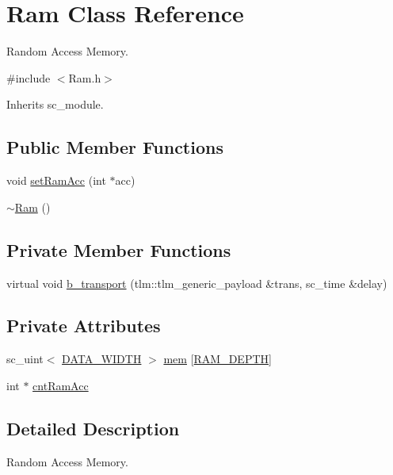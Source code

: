 \hypertarget{classRam}{\section{Ram Class Reference}
\label{classRam}
}


Random Access Memory.  




{\ttfamily \#include $<$Ram.\+h$>$}



Inherits sc\+\_\+module.

\subsection*{Public Member Functions}
\begin{DoxyCompactItemize}
\item 
void \hyperlink{classRam_ae60158266ebc375950bf310fcbebb95f}{set\+Ram\+Acc} (int $\ast$acc)
\item 
\hyperlink{classRam_a88fb1e8b99dad1628805952c41a146e3}{$\sim$\+Ram} ()
\end{DoxyCompactItemize}
\subsection*{Private Member Functions}
\begin{DoxyCompactItemize}
\item 
virtual void \hyperlink{classRam_a93cee12a3589cd5b05e16a88ed0ed5f1}{b\+\_\+transport} (tlm\+::tlm\+\_\+generic\+\_\+payload \&trans, sc\+\_\+time \&delay)
\end{DoxyCompactItemize}
\subsection*{Private Attributes}
\begin{DoxyCompactItemize}
\item 
sc\+\_\+uint$<$ \hyperlink{Defines_8h_af087b76f9707be9d3b43ba0c782c31c3}{D\+A\+T\+A\+\_\+\+W\+I\+D\+T\+H} $>$ \hyperlink{classRam_ade86bafdb14f3ddb236bcf807abab45c}{mem} \mbox{[}\hyperlink{Defines_8h_ab683dabe89fc48ada1209e0e3733862a}{R\+A\+M\+\_\+\+D\+E\+P\+T\+H}\mbox{]}
\item 
int $\ast$ \hyperlink{classRam_a0ee6ab8e997240bb0d37947f67c0ab7a}{cnt\+Ram\+Acc}
\end{DoxyCompactItemize}


\subsection{Detailed Description}
Random Access Memory. 

